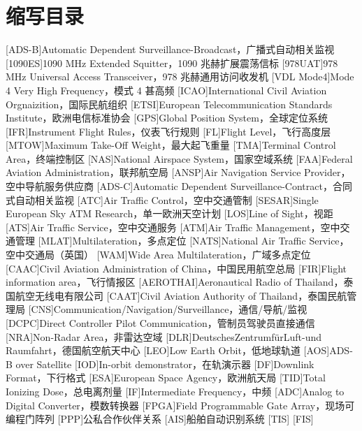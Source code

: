 
\chapter*{缩写目录}

\begin{acronym}
[ADS-B]{Automatic Dependent Surveillance-Broadcast，广播式自动相关监视}
[1090ES]{1090 MHz Extended Squitter，1090 兆赫扩展震荡信标}
[978UAT]{978 MHz Universal Access Transceiver，978 兆赫通用访问收发机}
[VDL Mode4]{Mode 4 Very High Frequency，模式 4 甚高频}
[ICAO]{International Civil Aviation Orgnaizition，国际民航组织}
[ETSI]{European Telecommunication Standards Institute，欧洲电信标准协会}
[GPS]{Global Position System，全球定位系统}
[IFR]{Instrument Flight Rules，仪表飞行规则}
[FL]{Flight Level，飞行高度层}
[MTOW]{Maximum Take-Off Weight，最大起飞重量}
[TMA]{Terminal Control Area，终端控制区}
[NAS]{National Airspace System，国家空域系统}
[FAA]{Federal Aviation Administration，联邦航空局}
[ANSP]{Air Navigation Service Provider，空中导航服务供应商}
[ADS-C]{Automatic Dependent Surveillance-Contract，合同式自动相关监视}
[ATC]{Air Traffic Control，空中交通管制}
[SESAR]{Single European Sky ATM Research，单一欧洲天空计划}
[LOS]{Line of Sight，视距}
[ATS]{Air Traffic Service，空中交通服务}
[ATM]{Air Traffic Management，空中交通管理}
[MLAT]{Multilateration，多点定位}
[NATS]{National Air Traffic Service，空中交通局（英国）}
[WAM]{Wide Area Multilateration，广域多点定位}
[CAAC]{Civil Aviation Administration of China，中国民用航空总局}
[FIR]{Flight information area，飞行情报区}
[AEROTHAI]{Aeronautical Radio of Thailand，泰国航空无线电有限公司}
[CAAT]{Civil Aviation Authority of Thailand，泰国民航管理局}
[CNS]{Communication/Navigation/Surveillance，通信/导航/监视}
[DCPC]{Direct Controller Pilot Communication，管制员驾驶员直接通信}
[NRA]{Non-Radar Area，非雷达空域}
[DLR]{DeutschesZentrumfürLuft-und Raumfahrt，德国航空航天中心}
[LEO]{Low Earth Orbit，低地球轨道}
[AOS]{ADS-B over Satellite}
[IOD]{In-orbit demonstrator，在轨演示器}
[DF]{Downlink Format，下行格式}
[ESA]{European Space Agency，欧洲航天局}
[TID]{Total Ionizing Dose，总电离剂量}
[IF]{Intermediate Frequency，中频}
[ADC]{Analog to Digital Converter，模数转换器}
[FPGA]{Field Programmable Gate Array，现场可编程门阵列}
[PPP]{公私合作伙伴关系}
[AIS]{船舶自动识别系统}
[TIS]{}
[FIS]{}
\end{acronym}

\pagestyle{acronympage}